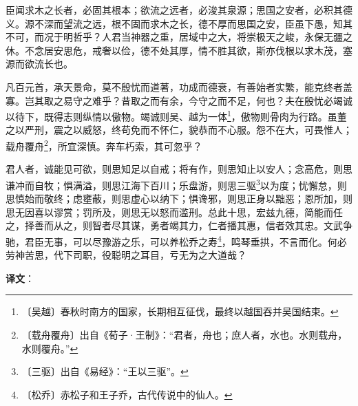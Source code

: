 \documentclass[12pt,UTF-8,openany,a4]{ctexbook}
\begin{document}
\begin{large}
    
    臣闻求木之长者，必固其根本；欲流之远者，必浚其泉源；思国之安者，必积其德义。源不深而望流之远，根不固而求木之长，德不厚而思国之安，臣虽下愚，知其不可，而况于明哲乎？人君当神器之重，居域中之大，将崇极天之峻，永保无疆之休。不念居安思危，戒奢以俭，德不处其厚，情不胜其欲，斯亦伐根以求木茂，塞源而欲流长也。
    
    凡百元首，承天景命，莫不殷忧而道著，功成而德衰，有善始者实繁，能克终者盖寡。岂其取之易守之难乎？昔取之而有余，今守之而不足，何也？夫在殷忧必竭诚以待下，既得志则纵情以傲物。竭诚则吴、越为一体\footnote{〔吴越〕\yiwen 春秋时南方的国家，长期相互征伐，最终以越国吞并吴国结束。}，傲物则骨肉为行路。虽董之以严刑，震之以威怒，终苟免而不怀仁，貌恭而不心服。怨不在大，可畏惟人；载舟覆舟\footnote{〔载舟覆舟〕\yiwen 出自《荀子·王制》：“君者，舟也；庶人者，水也。水则载舟，水则覆舟。”}，所宜深慎。奔车朽索，其可忽乎？
    
    君人者，诚能见可欲，则思知足以自戒；将有作，则思知止以安人；念高危，则思谦冲而自牧；惧满溢，则思江海下百川；乐盘游，则思三驱\footnote{〔三驱〕\yiwen 出自《易经》：“王以三驱”。}以为度；忧懈怠，则思慎始而敬终；虑壅蔽，则思虚心以纳下；惧谗邪，则思正身以黜恶；恩所加，则思无因喜以谬赏；罚所及，则思无以怒而滥刑。总此十思，宏兹九德，简能而任之，择善而从之，则智者尽其谋，勇者竭其力，仁者播其惠，信者效其忠。文武争驰，君臣无事，可以尽豫游之乐，可以养松乔之寿\footnote{〔松乔〕\yiwen 赤松子和王子乔，古代传说中的仙人。}，鸣琴垂拱，不言而化。何必劳神苦思，代下司职，役聪明之耳目，亏无为之大道哉？

\end{large}


\newpage

\begin{Large}
   \noindent \textbf{译文}：
\end{Large}

\vspace{1em}
\end{document}
